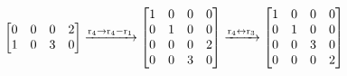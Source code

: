 \documentclass[red]{tutorial}
\theoremstyle{definition}
\theoremstyle{theorem}
\begin{document}
\begin{tutorial}
\begin{enumerate}
\begin{align*}
\begin{bmatrix}
          0 & 0 & 0 & 2 \\
          1 & 0 & 3 & 0
        \end{bmatrix}
        \xrightarrow{\mathrm{r}_{4} \to \mathrm{r}_{4}-\mathrm{r}_{1}}
        \begin{bmatrix}
          1 & 0 & 0 & 0 \\
          0 & 1 & 0 & 0 \\
          0 & 0 & 0 & 2 \\
          0 & 0 & 3 & 0
        \end{bmatrix}
        &\xrightarrow{\mathrm{r}_{4} \leftrightarrow \mathrm{r}_{3}}
        \begin{bmatrix}
          1 & 0 & 0 & 0 \\
          0 & 1 & 0 & 0 \\
          0 & 0 & 3 & 0 \\
          0 & 0 & 0 & 2
        \end{bmatrix}&&
      \end{align*}


\end{enumerate}
\end{tutorial}
\end{document}
